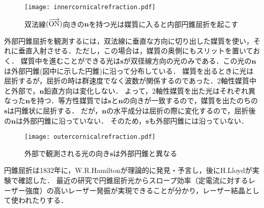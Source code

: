 \begin{figure}[ht]
  \centering
  \texttt{[image: innercornicalrefraction.pdf]}
  \caption{双法線$(\protect\overrightarrow{\text{ON}})$向きの$\boldsymbol{n}$を持つ光は媒質に入ると内部円錐屈折を起こす}
  \label{innercornicalrefraction}
\end{figure}

外部円錐屈折を観測するには，双法線に垂直な方向に切り出した媒質を使い，それに垂直入射させる．ただし，この場合は，媒質の奥側にもスリットを置いておく．
媒質中を進むことができる光は$\boldsymbol{s}$が双径線方向の光のみである．この光の$\boldsymbol{n}$は外部円錐(図中に示した円錐)に沿って分布している．
媒質を出るときに光は屈折するが，屈折の時は群速度でなく波数が関係するのであった．2軸性媒質中と外部で，$\boldsymbol{n}$鉛直方向は変化しない．
よって，2軸性媒質を出た光はそれぞれ異なった$\boldsymbol{n}$を持つ．等方性媒質では$\boldsymbol{s}$と$\boldsymbol{n}$の向きが一致するので，媒質を出たのちの$\boldsymbol{s}$は円錐状に屈折する．
だが，$\boldsymbol{n}$の水平成分は屈折の際に変化するので，屈折後の$\boldsymbol{n}$は外部円錐に沿っていない．
そのため，$\boldsymbol{s}$も外部円錐には沿っていない．

\begin{figure}[ht]
  \centering
  \texttt{[image: outercornicalrefraction.pdf]}
  \caption{外部で観測される光の向き$\boldsymbol{s}$は外部円錐と異なる}
  \label{outercornicalrefraction}
\end{figure}

円錐屈折は1832年に，W.R.Hamiltonが理論的に発見・予言し，後にH.Lloydが実験で確認した．
最近の研究で円錐屈折光からスロープ効率（定電流に対するレーザー強度）の高いレーザー発振が実現できることが分かり，レーザー結晶として使われたりする．
